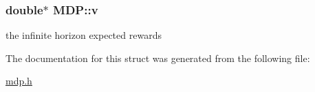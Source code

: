 \subsubsection[{\texorpdfstring{v}{v}}]{\setlength{\rightskip}{0pt plus 5cm}double$\ast$ M\+D\+P\+::v}\hypertarget{structMDP_aa2f74ec366c164a7121fd46a24cbabce}{}\label{structMDP_aa2f74ec366c164a7121fd46a24cbabce}
the infinite horizon expected rewards 

The documentation for this struct was generated from the following file\+:\begin{DoxyCompactItemize}
\item 
\hyperlink{mdp_8h}{mdp.\+h}\end{DoxyCompactItemize}
